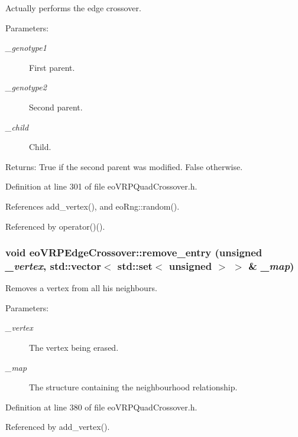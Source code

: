 Actually performs the edge crossover. 

\begin{Desc}
\item[Parameters:]
\begin{description}
\item[{\em \_\-genotype1}]First parent. \item[{\em \_\-genotype2}]Second parent. \item[{\em \_\-child}]Child. \end{description}
\end{Desc}
\begin{Desc}
\item[Returns:]True if the second parent was modified. False otherwise. \end{Desc}


Definition at line 301 of file eo\-VRPQuad\-Crossover.h.

References add\_\-vertex(), and eo\-Rng::random().

Referenced by operator()().
\subsubsection{\setlength{\rightskip}{0pt plus 5cm}void eo\-VRPEdge\-Crossover::remove\_\-entry (unsigned {\em \_\-vertex}, std::vector$<$ std::set$<$ unsigned $>$ $>$ \& {\em \_\-map})\hspace{0.3cm}{\tt  [inline, private]}}\label{classeo_v_r_p_edge_crossover_df9886f80565a966c78fb5a08e12631f}


Removes a vertex from all his neighbours. 

\begin{Desc}
\item[Parameters:]
\begin{description}
\item[{\em \_\-vertex}]The vertex being erased. \item[{\em \_\-map}]The structure containing the neighbourhood relationship. \end{description}
\end{Desc}


Definition at line 380 of file eo\-VRPQuad\-Crossover.h.

Referenced by add\_\-vertex().

